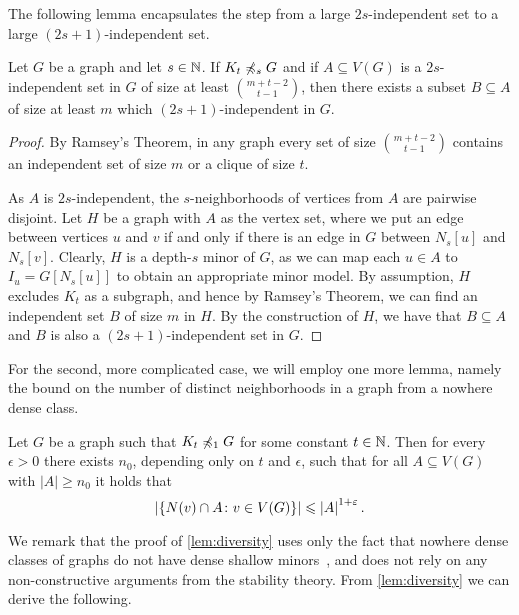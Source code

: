 The following lemma encapsulates the step from a large $2s$-independent set to a large $(2s+1)$-independent set.

\begin{lemma}\label{lem:ramsey1}
Let $G$ be a graph and let $s\in \mathbb{N}$. If $K_t\not\preccurlyeq_{s} G$ and 
if $A\subseteq V(G)$ is a $2s$-independent set in $G$ of
size at least $\binom{m+t-2}{t-1}$, then there exists
a subset $B\subseteq A$ of size at least $m$ which $(2s+1)$-independent in $G$. 
\end{lemma}
\begin{proof}
By Ramsey's Theorem, in any graph every set of size $\binom{m+t-2}{t-1}$ contains an
independent set of size $m$ or a clique of size $t$. 

As $A$ is $2s$-independent, the $s$-neighborhoods of vertices from $A$ are pairwise disjoint.
Let $H$ be a graph with $A$ as the vertex set, where we put an edge between vertices $u$ and $v$ if and only if there is an edge in $G$ between $N_s[u]$ and $N_s[v]$.
Clearly, $H$ is a depth-$s$ minor of $G$, as we can map each $u\in A$ to $I_u=G[N_s[u]]$ to obtain an appropriate minor model.
By assumption, 
$H$ excludes $K_t$ as a subgraph, and hence by Ramsey's Theorem,
we can find an independent set $B$ of size $m$ in $H$. 
By the construction of $H$, we have that $B\subseteq A$ and $B$ is also a $(2s+1)$-independent set in $G$. 
\end{proof}

For the second, more complicated case, 
we will employ one more lemma, namely the bound on the number of distinct neighborhoods in a graph from a nowhere dense class.

\begin{lemma}\label{lem:diversity}
Let $G$ be a graph such that $K_t\not\preccurlyeq_{1} G$ for some constant $t\in \mathbb{N}$. 
Then for every $\epsilon>0$ there exists $n_0$, depending only on $t$ and $\epsilon$, such that for all $A\subseteq V(G)$ with $|A|\geq n_0$ it holds that
\[\left\lvert\{N(v)\cap A \colon v\in V(G)\}\right\rvert\leqslant\left\lvert A\right\rvert^{1+\varepsilon}.\]
\end{lemma}

We remark that the proof of \cref{lem:diversity} uses only the fact that
nowhere dense classes of graphs do not have dense 
shallow minors~\cite{dvorak2007asymptotical,jiang2011compact}, and does not rely on any non-constructive arguments from the stability theory.
From \cref{lem:diversity} we can derive the following.

